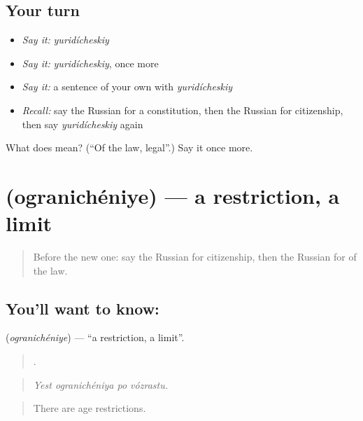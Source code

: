 \subsection*{Your turn}
\begin{itemize}
\raggedright
  \item \emph{Say it:} \emph{yuridícheskiy}
  \item \emph{Say it:} \emph{yuridícheskiy}, once more
  \item \emph{Say it:} a sentence of your own with \emph{yuridícheskiy}
  \item \emph{Recall:} say the Russian for a constitution, then the Russian for citizenship, then say \emph{yuridícheskiy} again
\end{itemize}

\begin{tcolorbox}[breakable,colback=teal!4,colframe=teal!35!black,title={Before you move on}]
What does  mean? (\textquotedblleft{}Of the law, legal\textquotedblright{}.) Say it once more.
\end{tcolorbox}
\section[\texorpdfstring{\ru{ограничение} (ogranichéniye)}{ограничение (ogranichéniye)}]{ (ogranichéniye) — a restriction, a limit}

\label{lesson:RU-C391-ogranichenie}



\begin{quote}
Before the new one: say the Russian for citizenship, then the Russian for of the law.
\end{quote}

\subsection*{You'll want to know: }
\textbf{} (\emph{ogranichéniye}) — \textquotedblleft{}a restriction, a limit\textquotedblright{}.

\begin{quote}
   .
\end{quote}

\begin{quote}
\emph{Yest ogranichéniya po vózrastu.}
\end{quote}

\begin{quote}
There are age restrictions.
\end{quote}

